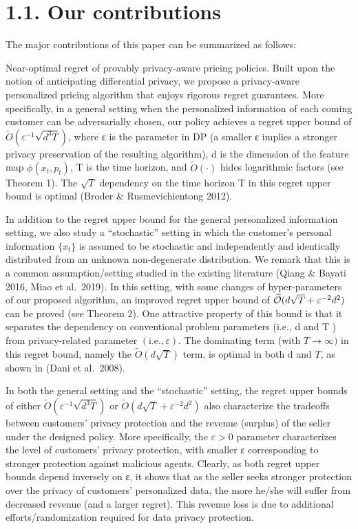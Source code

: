 \section{1.1. Our contributions}\label{our-contributions}

The major contributions of this paper can be summarized as follows:

Near-optimal regret of provably privacy-aware pricing policies. Built upon the notion of anticipating differential privacy, we propose a privacy-aware personalized pricing algorithm that enjoys rigorous regret guarantees. More specifically, in a general setting when the personalized information of each coming customer can be adversarially chosen, our policy achieves a regret upper bound of \(\widetilde { O } ( \varepsilon ^ { - 1 } \sqrt { d ^ { 3 } T } )\), where ε is the parameter in DP (a smaller ε implies a stronger privacy preservation of the resulting algorithm), d is the dimension of the feature map \(\phi ( x _ { t } , p _ { t } )\), T is the time horizon, and \({ \widetilde { O } } ( \cdot )\) hides logarithmic factors (see Theorem 1). The \(\sqrt { T }\) dependency on the time horizon T in this regret upper bound is optimal (Broder \& Rusmevichientong 2012).

In addition to the regret upper bound for the general personalized information setting, we also study a ``stochastic'' setting in which the customer's personal information \(\{ x _ { t } \}\) is assumed to be stochastic and independently and identically distributed from an unknown non-degenerate distribution. We remark that this is a common assumption/setting studied in the existing literature (Qiang \& Bayati 2016, Miao et al.~2019). In this setting, with some changes of hyper-parameters of our proposed algorithm, an improved regret upper bound of \(\widetilde { \cal O } ( d \sqrt { T } + \varepsilon ^ { - 2 } d ^ { 2 } )\) can be proved (see Theorem 2). One attractive property of this bound is that it separates the dependency on conventional problem parameters (i.e., d and T ) from privacy-related parameter \(( \mathrm { i . e . , } \varepsilon )\). The dominating term (with \(T \to \infty )\) in this regret bound, namely the \(\widetilde { O } ( d \sqrt { T } )\) term, is optimal in both d and \(T\), as shown in (Dani et al.~2008).

In both the general setting and the ``stochastic'' setting, the regret upper bounds of either \(\widetilde { O } ( \varepsilon ^ { - 1 } \sqrt { d ^ { 3 } T } )\) or \(\widetilde { O } ( d \sqrt { T } + \varepsilon ^ { - 2 } d ^ { 2 } )\) also characterize the tradeoffs between customers' privacy protection and the revenue (surplus) of the seller under the designed policy. More specifically, the \(\varepsilon > 0\) parameter characterizes the level of customers' privacy protection, with smaller ε corresponding to stronger protection against malicious agents. Clearly, as both regret upper bounds depend inversely on ε, it shows that as the seller seeks stronger protection over the privacy of customers' personalized data, the more he/she will suffer from decreased revenue (and a larger regret). This revenue loss is due to additional efforts/randomization required for data privacy protection.

